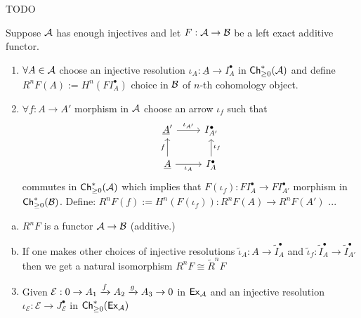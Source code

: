 \documentclass[a4paper]{report}
\begin{document}
\begin{exmp}TODO

\end{exmp}

\begin{const}
  Suppose $\mathcal{A}$ has enough injectives and let $F: \mathcal{A} \to \mathcal{B}$ be a left exact additive functor.
  \begin{enumerate}
    \item $\forall A \in \mathcal{A}$ choose an injective resolution $\iota_{A}: \underline A \to I_{A}^{\bullet}$ in $\mathsf{Ch}^*_{\ge 0}(\mathcal{A})$ and define $R^{n}F(A) := H^{n}(FI^{\bullet}_{A})$ choice in $\mathcal{B}$ of $n$-th cohomology object.
    \item $\forall f: A \to A'$ morphism in $\mathcal{A}$ choose an arrow $\iota_{f}$ such that
          \[\begin{tikzcd}
\underline A' \arrow[r, "\iota_{A'}"]             & I^\bullet_{A'}                    \\
\underline A \arrow[u, "f"] \arrow[r, "\iota_A"'] & I^\bullet_A \arrow[u, "\iota_f"']
\end{tikzcd}\]commutes in $\mathsf{Ch}^*_{\ge 0}(\mathcal{A})$ which implies that $F(\iota_{f}) : FI^{\bullet}_{A} \to FI^{\bullet}_{A'}$ morphism in $\mathsf{Ch}^*_{\ge 0}(\mathcal{B})$.
          Define: $R^{n}F(f) := H^{n}(F(\iota_{f})) : R^{n}F(A) \to R^{n}F(A')$ ...
  \end{enumerate}
\end{const}

\begin{lemm}
\begin{enumerate}[(a)]
  \item $R^{n}F$ is a functor $\mathcal{A} \to \mathcal{B}$ (additive.)
        \item If one makes other choices of injective resolutions $\tilde \iota_{A}: A \to \tilde I^{\bullet}_{A}$ and $\tilde \iota_{f}: \tilde I^{\bullet}_{A} \to \tilde I^{\bullet}_{A'}$ then we  get a natural isomorphism $R^{n}F \cong \tilde R^{n}F$
\end{enumerate}
\end{lemm}
\begin{enumerate}\setcounter{enumi}{2}
\item Given $\mathcal E: 0 \to A_{1} \xrightarrow f A_{2} \xrightarrow g A_{3} \to 0$ in $\mathsf{Ex}_{\mathcal{A}}$ and an injective resolution $\iota_{\mathcal E}: \mathcal E \to J^{\bullet}_{\mathcal E}$ in $\mathsf{Ch}^*_{\ge 0}(\mathsf{Ex}_{\mathcal{A}})$
\end{enumerate}
\end{document}

